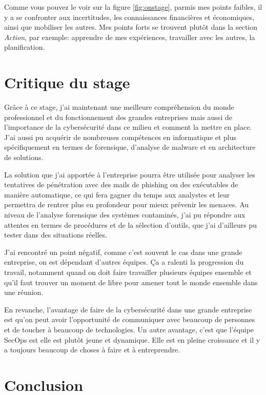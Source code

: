 Comme vous pouvez le voir sur la figure \ref{fig:onstage}, parmis mes points faibles, il y a se confronter aux incertitudes, les connaissances financières et économiques, ainsi que mobiliser les autres. Mes points forts se trouvent plutôt dans la section \textit{Action}, par exemple: apprendre de mes expériences, travailler avec les autres, la planification.





\section{Critique du stage}

Grâce à ce stage, j'ai maintenant une meilleure compréhension du monde professionnel et du fonctionnement des grandes entreprises mais aussi de l'importance de la cybersécurité dans ce milieu et comment la mettre en place. J'ai aussi pu acquérir de nombreuses compétences en informatique et plus spécifiquement en termes de forensique, d'analyse de malware et en architecture de solutions.

La solution que j'ai apportée à l'entreprise pourra être utilisée pour analyser les tentatives de pénétration avec des mails de phishing ou des exécutables de manière automatique, ce qui fera gagner du temps aux analystes et leur permettra de rentrer plus en profondeur pour mieux prévenir les menaces. Au niveau de l'analyse forensique des systèmes contaminés, j'ai pu répondre aux attentes en termes de procédures et de la sélection d'outils, que j'ai d'ailleurs pu tester dans des situations réelles.

J'ai rencontré un point négatif, comme c'est souvent le cas dans une grande entreprise, on est dépendant d'autres équipes. Ça a ralenti la progression du travail, notamment quand on doit faire travailler plusieurs équipes ensemble et qu'il faut trouver un moment de libre pour amener tout le monde ensemble dans une réunion.

En revanche, l'avantage de faire de la cybersécurité dans une grande entreprise est qu'on peut avoir l'opportunité de communiquer avec beaucoup de personnes et de toucher à beaucoup de technologies. Un autre avantage, c'est que l'équipe SecOps est elle est plutôt jeune et dynamique. Elle est en pleine croissance et il y a toujours beaucoup de choses à faire et à entreprendre.





\section{Conclusion}

